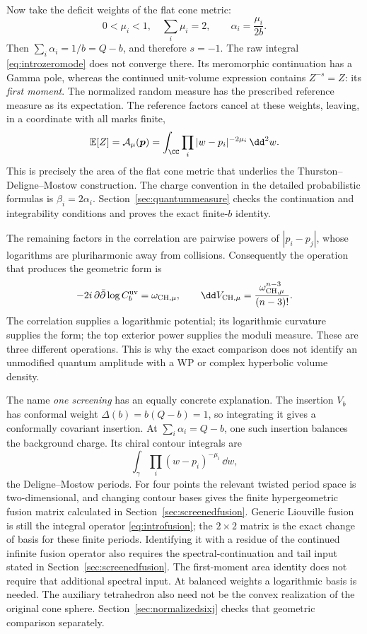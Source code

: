 Now take the deficit weights of the flat cone metric:
\[
 0<\mu_i<1,\quad \sum_i\mu_i=2,\qquad
 \alpha_i=\frac{\mu_i}{2b}.
\]
Then $\sum_i\alpha_i=1/b=Q-b$, and therefore $s=-1$.
The raw integral \eqref{eq:introzeromode} does not converge there.
Its meromorphic continuation has a Gamma pole, whereas the
continued unit-volume expression contains $Z^{-s}=Z$: its
\emph{first moment}. The normalized random measure has the prescribed
reference measure as its expectation. The reference factors cancel
at these weights, leaving, in a coordinate with all marks finite,
\begin{equation}
 \mathbb E[Z]=\mathcal A_\mu(\boldsymbol p)
   =\int_{\CC}\prod_i|w-p_i|^{-2\mu_i}\,\dd^2w.
 \label{eq:introfirstmoment}
\end{equation}
This is precisely the area of the flat cone metric that underlies
the Thurston--Deligne--Mostow construction. The charge convention
in the detailed probabilistic formulas is $\beta_i=2\alpha_i$.
Section~\ref{sec:quantummeasure} checks the continuation and
integrability conditions and proves the exact finite-$b$ identity.

The remaining factors in the correlation are pairwise powers of
$|p_i-p_j|$, whose logarithms are pluriharmonic away from collisions.
Consequently the operation that produces the geometric form is
\begin{equation}
 -2i\,\partial\bar\partial\log C_b^{\rm uv}
     =\omega_{\mathrm{CH},\mu},\qquad
 \dd V_{\mathrm{CH},\mu}
     =\frac{\omega_{\mathrm{CH},\mu}^{n-3}}{(n-3)!}.
 \label{eq:introcurvaturemeasure}
\end{equation}
The correlation supplies a logarithmic potential; its logarithmic
curvature supplies the form; the top exterior power supplies the
moduli measure. These are three different operations. This is why
the exact comparison does not identify an unmodified quantum
amplitude with a WP or complex hyperbolic volume density.

The name \emph{one screening} has an equally concrete explanation.
The insertion $V_b$ has conformal weight
$\Delta(b)=b(Q-b)=1$, so integrating it gives a conformally
covariant insertion. At $\sum_i\alpha_i=Q-b$, one such insertion
balances the background charge. Its chiral contour integrals are
\[
 \int_\gamma\prod_i(w-p_i)^{-\mu_i}\,\dd w,
\]
the Deligne--Mostow periods. For four points the relevant twisted
period space is two-dimensional, and changing contour bases gives
the finite hypergeometric fusion matrix calculated in
Section~\ref{sec:screenedfusion}. Generic Liouville fusion is still
the integral operator \eqref{eq:introfusion}; the $2\times2$ matrix
is the exact change of basis for these finite periods. Identifying
it with a residue of the continued infinite fusion operator also
requires the spectral-continuation and tail input stated in
Section~\ref{sec:screenedfusion}. The first-moment area identity
does not require that additional spectral input. At balanced
weights a logarithmic basis is needed. The auxiliary tetrahedron
also need not be the convex realization of the original cone
sphere. Section~\ref{sec:normalizedsixj} checks that geometric
comparison separately.

